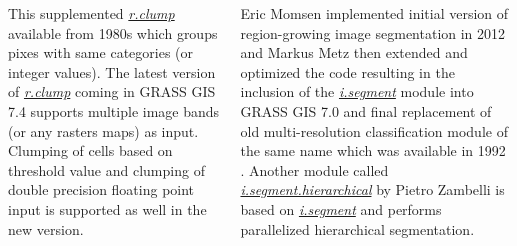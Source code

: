 \documentclass[25pt, margin=0mm, innermargin=15mm, blockverticalspace=15mm, colspace=15mm, subcolspace=8mm]{tikzposter}
\newcommand{\gmodule}[1]{\href{http://grass.osgeo.org/grass72/manuals/#1.html}{\emph{#1}}}
\newcommand{\gamodule}[1]{\href{http://grass.osgeo.org/grass72/manuals/addons/#1.html}{\emph{#1}}}
\begin{document}
\begin{columns}
{This supplemented \gmodule{r.clump} available from 1980s
which groups pixes with same categories (or integer values).
The latest version of \gmodule{r.clump} coming in GRASS GIS 7.4
supports multiple image bands (or any rasters maps) as input.
Clumping of cells based on threshold value and clumping
of double precision floating point input is supported as well in the new version.

Eric Momsen implemented initial version of region-growing image segmentation in 2012
and Markus Metz then extended and optimized the code resulting in
the inclusion of the \gmodule{i.segment} module into GRASS GIS 7.0
and final replacement of old multi-resolution classification module of the same name
which was available in 1992 \citep{zhuang1992image}.
Another module called \gamodule{i.segment.hierarchical} by Pietro Zambelli is based on \gmodule{i.segment}
and performs parallelized hierarchical segmentation.

\vspace*{0.7cm}

}
\end{columns}
\end{document}
